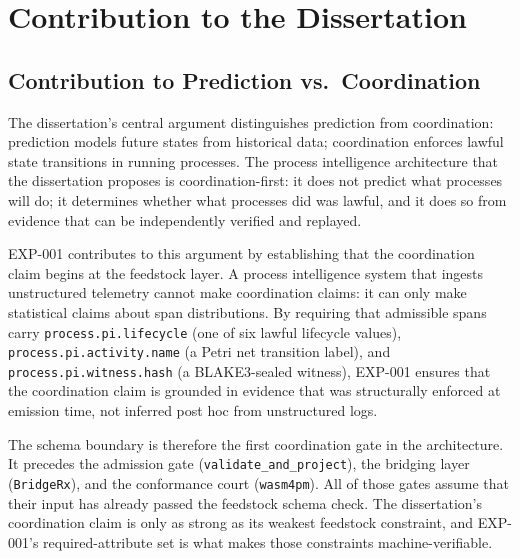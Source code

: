 
\section{Contribution to the Dissertation}
\label{sec:otel-weaver-exp-001-custom-pi-registry-contribution}

\subsection{Contribution to Prediction vs.~Coordination}
\label{sec:otel-weaver-exp-001-custom-pi-registry-contribution-prediction}

The dissertation's central argument distinguishes prediction from coordination: prediction models
future states from historical data; coordination enforces lawful state transitions in running
processes. The process intelligence architecture that the dissertation proposes is coordination-first:
it does not predict what processes will do; it determines whether what processes did was lawful,
and it does so from evidence that can be independently verified and replayed.

EXP-001 contributes to this argument by establishing that the coordination claim begins at the
feedstock layer. A process intelligence system that ingests unstructured telemetry cannot make
coordination claims: it can only make statistical claims about span distributions. By requiring
that admissible spans carry \texttt{process.pi.lifecycle} (one of six lawful lifecycle values),
\texttt{process.pi.activity.name} (a Petri net transition label), and
\texttt{process.pi.witness.hash} (a BLAKE3-sealed witness), EXP-001 ensures that the
coordination claim is grounded in evidence that was structurally enforced at emission time, not
inferred post hoc from unstructured logs.

The schema boundary is therefore the first coordination gate in the architecture. It precedes the
admission gate (\texttt{validate\_and\_project}), the bridging layer (\texttt{BridgeRx}), and
the conformance court (\texttt{wasm4pm}). All of those gates assume that their input has already
passed the feedstock schema check. The dissertation's coordination claim is only as strong as its
weakest feedstock constraint, and EXP-001's required-attribute set is what makes those constraints
machine-verifiable.


